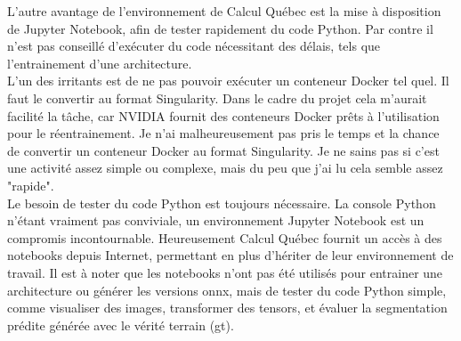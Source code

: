 \noindent L'autre avantage de l'environnement de Calcul Québec est la mise à disposition de Jupyter Notebook, afin de tester rapidement du code Python. Par contre il n'est pas conseillé d'exécuter du code nécessitant des délais, tels que l'entrainement d'une architecture. 
\vspace{0.5\baselineskip}
\\
\noindent L'un des irritants est de ne pas pouvoir exécuter un conteneur Docker tel quel. Il faut le convertir au format Singularity. Dans le cadre du projet cela m'aurait facilité la tâche, car NVIDIA fournit des conteneurs Docker prêts à l'utilisation pour le réentrainement. Je n'ai malheureusement pas pris le temps et la chance de convertir un conteneur Docker au format Singularity. Je ne sains pas si c'est une activité assez simple ou complexe, mais du peu que j'ai lu cela semble assez "rapide".
\vspace{0.5\baselineskip}
\\
\noindent Le besoin de tester du code Python est toujours nécessaire. La console Python n'étant vraiment pas conviviale, un environnement Jupyter Notebook est un compromis incontournable. Heureusement Calcul Québec fournit un accès à des notebooks depuis Internet, permettant en plus d'hériter de leur environnement de travail. Il est à noter que les notebooks n'ont pas été utilisés pour entrainer une architecture ou générer les versions \acrshort{onnx}, mais de tester du code Python simple, comme visualiser des images, transformer des tensors, et évaluer la segmentation prédite générée avec le vérité terrain (\acrshort{gt}). 
